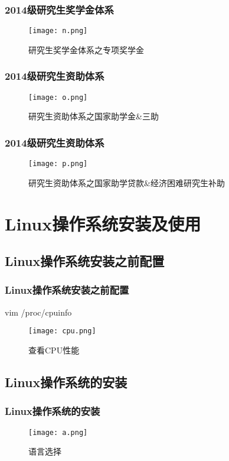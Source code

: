 \documentclass[notheorems,mathserif,table,compress]{beamer}  %
\begin{document}
\begin{frame}
  \frametitle{2014级研究生奖学金体系}
  \begin{figure}[!ht]
  \centering\texttt{[image: n.png]}
  \caption{研究生奖学金体系之专项奖学金}
  \end{figure} 
\end{frame}

\begin{frame}
  \frametitle{2014级研究生资助体系}
  \begin{figure}[!ht]
  \centering\texttt{[image: o.png]}
  \caption{研究生资助体系之国家助学金\&三助}
  \end{figure} 
\end{frame}

\begin{frame}
  \frametitle{2014级研究生资助体系}
  \begin{figure}[!ht]
  \centering\texttt{[image: p.png]}
  \caption{研究生资助体系之国家助学贷款\&经济困难研究生补助}
  \end{figure} 
\end{frame}

\section{Linux操作系统安装及使用}

\subsection{Linux操作系统安装之前配置}

\begin{frame}
  \frametitle{Linux操作系统安装之前配置}
   vim /proc/cpuinfo
  \begin{figure}[!ht]
  \centering\texttt{[image: cpu.png]}
  \caption{查看CPU性能}
  \end{figure} 
\end{frame}

\subsection{Linux操作系统的安装}

\begin{frame}
  \frametitle{Linux操作系统的安装}
  \begin{figure}[!ht]
  \centering\texttt{[image: a.png]}
  \caption{语言选择}
  \label{fig:1}
  \end{figure}
\end{frame}
  
\end{document}
